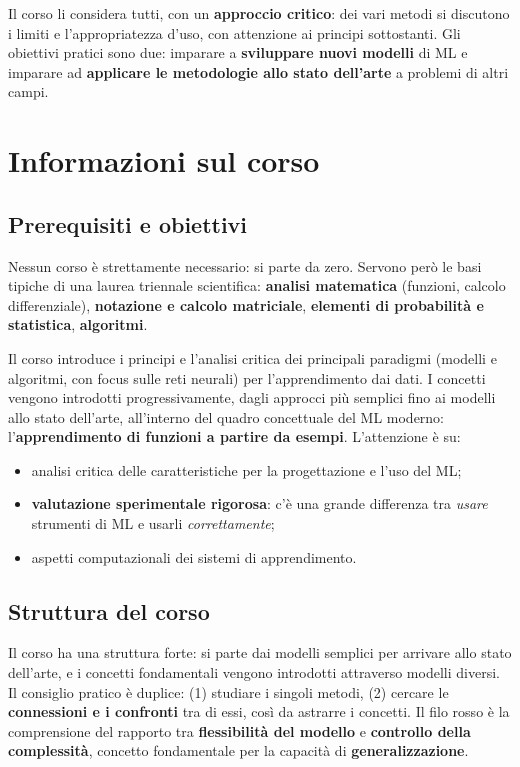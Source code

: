 Il corso li considera tutti, con un \textbf{approccio critico}: dei vari
metodi si discutono i limiti e l'appropriatezza d'uso, con attenzione ai
principi sottostanti. Gli obiettivi pratici sono due: imparare a
\textbf{sviluppare nuovi modelli} di ML e imparare ad \textbf{applicare
le metodologie allo stato dell'arte} a problemi di altri campi.

\section{Informazioni sul corso}\label{informazioni-sul-corso}

\subsection{Prerequisiti e obiettivi}\label{prerequisiti-e-obiettivi}

Nessun corso è strettamente necessario: si parte da zero. Servono però
le basi tipiche di una laurea triennale scientifica: \textbf{analisi
matematica} (funzioni, calcolo differenziale), \textbf{notazione e
calcolo matriciale}, \textbf{elementi di probabilità e statistica},
\textbf{algoritmi}.

Il corso introduce i principi e l'analisi critica dei principali
paradigmi (modelli e algoritmi, con focus sulle reti neurali) per
l'apprendimento dai dati. I concetti vengono introdotti
progressivamente, dagli approcci più semplici fino ai modelli allo stato
dell'arte, all'interno del quadro concettuale del ML moderno:
l'\textbf{apprendimento di funzioni a partire da esempi}. L'attenzione è
su:

\begin{itemize}
\tightlist
\item
  analisi critica delle caratteristiche per la progettazione e l'uso del
  ML;
\item
  \textbf{valutazione sperimentale rigorosa}: c'è una grande differenza
  tra \emph{usare} strumenti di ML e usarli \emph{correttamente};
\item
  aspetti computazionali dei sistemi di apprendimento.
\end{itemize}

\subsection{Struttura del corso}\label{struttura-del-corso}

Il corso ha una struttura forte: si parte dai modelli semplici per
arrivare allo stato dell'arte, e i concetti fondamentali vengono
introdotti attraverso modelli diversi. Il consiglio pratico è duplice:
(1) studiare i singoli metodi, (2) cercare le \textbf{connessioni e i
confronti} tra di essi, così da astrarre i concetti. Il filo rosso è la
comprensione del rapporto tra \textbf{flessibilità del modello} e
\textbf{controllo della complessità}, concetto fondamentale per la
capacità di \textbf{generalizzazione}.

